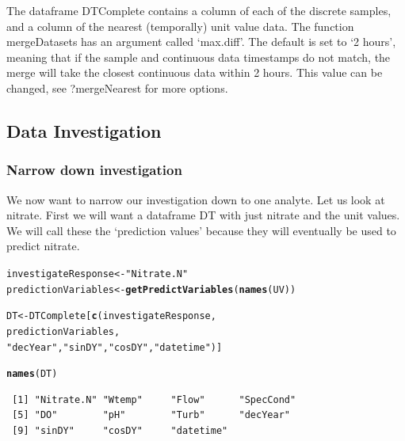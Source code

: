 \documentclass[a4paper,11pt]{article}\usepackage[]{graphicx}\usepackage[]{color}
\makeatletter
\newcommand{\hlstr}[1]{\textcolor[rgb]{0.192,0.494,0.8}{#1}}%
\newcommand{\hlstd}[1]{\textcolor[rgb]{0.345,0.345,0.345}{#1}}%
\newcommand{\hlkwb}[1]{\textcolor[rgb]{0.69,0.353,0.396}{#1}}%
\newcommand{\hlkwd}[1]{\textcolor[rgb]{0.737,0.353,0.396}{\textbf{#1}}}%
\newenvironment{kframe}{%
 \def\at@end@of@kframe{}%
 \ifinner\ifhmode%
  \def\at@end@of@kframe{\end{minipage}}%
  \begin{minipage}{\columnwidth}%
 \fi\fi%
 \def\FrameCommand##1{\hskip\@totalleftmargin \hskip-\fboxsep
 \colorbox{shadecolor}{##1}\hskip-\fboxsep
     \hskip-\linewidth \hskip-\@totalleftmargin \hskip\columnwidth}%
 \MakeFramed {\advance\hsize-\width
   \@totalleftmargin\z@ \linewidth\hsize
   \@setminipage}}%
 {\par\unskip\endMakeFramed%
 \at@end@of@kframe}
\newenvironment{knitrout}{}{} %
\makeatother
\begin{document}
The dataframe DTComplete contains a column of each of the discrete samples, and a column of the nearest (temporally) unit value data. The function mergeDatasets has an argument called `max.diff'. The default is set to `2 hours', meaning that if the sample and continuous data timestamps do not match, the merge will take the closest continuous data within 2 hours. This value can be changed, see ?mergeNearest for more options.

\subsection{Data Investigation}

\subsubsection{Narrow down investigation}


We now want to narrow our investigation down to one analyte. Let us look at nitrate. First we will want a dataframe DT with just nitrate and the unit values. We will call these the `prediction values' because they will eventually be used to predict nitrate.

\begin{knitrout}
\color{fgcolor}\begin{kframe}
\begin{alltt}
\hlstd{investigateResponse} \hlkwb{<-} \hlstr{"Nitrate.N"}
\hlstd{predictionVariables} \hlkwb{<-} \hlkwd{getPredictVariables}\hlstd{(}\hlkwd{names}\hlstd{(UV))}

\hlstd{DT} \hlkwb{<-} \hlstd{DTComplete[}\hlkwd{c}\hlstd{(investigateResponse,}
                   \hlstd{predictionVariables,}
                   \hlstr{"decYear"}\hlstd{,}\hlstr{"sinDY"}\hlstd{,}\hlstr{"cosDY"}\hlstd{,}\hlstr{"datetime"}\hlstd{)]}

\hlkwd{names}\hlstd{(DT)}
\end{alltt}
\begin{verbatim}
 [1] "Nitrate.N" "Wtemp"     "Flow"      "SpecCond" 
 [5] "DO"        "pH"        "Turb"      "decYear"  
 [9] "sinDY"     "cosDY"     "datetime" 
\end{verbatim}
\end{kframe}
\end{knitrout}
\end{document}
